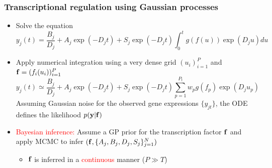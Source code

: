 \documentclass{beamer}
\begin{document}
\frame
{
 \frametitle{Transcriptional regulation using Gaussian processes}


\begin{itemize}
\item Solve the equation %
$$
y_j(t) = \frac{B_j}{D_j} +  A_j \exp(-D_j t) +
S_j \exp(-D_j t) \int_{0}^t g(f(u)) \exp(D_j u) du
$$

\item Apply numerical integration using a very dense grid $(u_i)_{i=1}^P$ and  $\mathbf{f} = (f_i(u_i))_{i=1}^P$ 
$$
y_j(t) \simeq \frac{B_j}{D_j} +  A_j \exp(-D_j t) +
S_j \exp(-D_j t) \sum_{p=1}^{P_t} w_p g(f_p) \exp(D_j u_p)
$$
Assuming Gaussian noise for the observed gene expressions $\{y_{jt}\}$, the ODE
defines the likelihood $p(\mathbf{y}|\mathbf{f})$
\item \textcolor{red}{Bayesian inference:} Assume a GP prior for the
 transcription factor $\mathbf{f}$ and apply MCMC to infer 
 $(\mathbf{f}, \{A_j,B_j,D_j,S_j\}_{j=1}^N)$

\begin{itemize}
%
%
%

\item $\mathbf{f}$ is inferred in a \textcolor{red}{continuous} manner ($P \gg T$)

\end{itemize}

%
%
%
%
%


\end{itemize}

}
\end{document}
